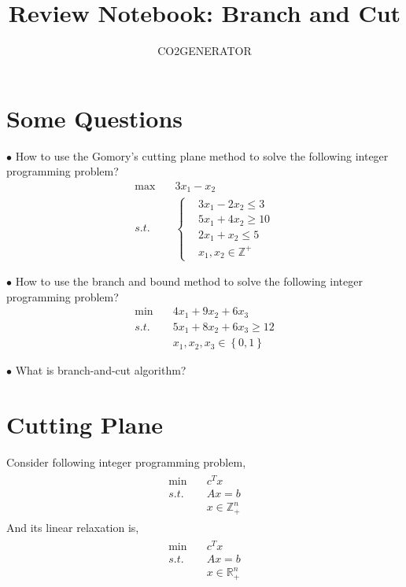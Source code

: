 \documentclass{article}
\title {Review Notebook: Branch and Cut}
\author{CO2GENERATOR}
\begin{document}
\maketitle 
\allowdisplaybreaks[4]

\section{Some Questions}

\noindent $\bullet$ How to use the Gomory's cutting plane method to solve the following integer programming problem?
\begin{align}
	\max \quad & 3x_1 - x_2 \\
	s.t. \quad & \left\{
	\begin{aligned}
		& 3x_1 - 2x_2 \leq 3 \\
		& 5x_1 + 4x_2 \geq 10 \\
		& 2x_1 + x_2 \leq 5 \\
		& x_1, x_2 \in \mathbb{Z}^+
	\end{aligned}\right.
\end{align}

\noindent $\bullet$ How to use the branch and bound method to solve the following integer programming problem?
\begin{align}
\min \quad & 4x_1 + 9x_2 + 6x_3 \\
s.t. \quad & 5x_1 + 8x_2 + 6x_3 \geq 12 \\
& x_1, x_2, x_3 \in \left\{0, 1\right\}
\end{align}

\noindent $\bullet$ What is branch-and-cut algorithm?

\newpage
\section{Cutting Plane}

Consider following integer programming problem,
\begin{align}
\label{problem:ip}
\begin{aligned}
\min \quad & c^Tx \\
s.t. \quad & Ax = b \\
& x \in \mathbb{Z}_+^n
\end{aligned}
\end{align}
And its linear relaxation is,
\begin{align}
\label{linear-relaxation}
\begin{aligned}
\min \quad & c^Tx \\
s.t. \quad & Ax = b \\
& x \in \mathbb{R}_+^n
\end{aligned}
\end{align}
\end{document}
